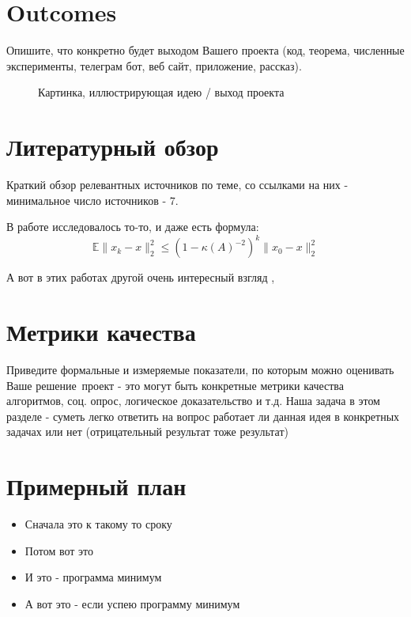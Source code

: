 \documentclass[]{scrartcl}
\begin{document}
\section{Outcomes}

Опишите, что конкретно будет выходом Вашего проекта (код, теорема, численные эксперименты, телеграм бот, веб сайт, приложение, рассказ).

\begin{figure}[h!]
	\caption{Картинка, иллюстрирующая идею / выход проекта}
\end{figure}


\section{Литературный обзор}
Краткий обзор релевантных источников по теме, со ссылками на них - минимальное число источников - 7.


В работе \cite{strohmer2009randomized} исследовалось то-то, и даже есть формула:
\begin{equation}
\mathbb{E} \|x_k - x\|_2^2 \leq \left(1 - \kappa (A) ^{-2}\right)^k \|x_0 - x\|_2^2
\end{equation}


А вот в этих работах другой очень интересный взгляд \cite{gower2015randomized}, \cite{dai2014randomized} 

\section{Метрики качества}
Приведите формальные и измеряемые показатели, по которым можно оценивать Ваше решение\ проект - это могут быть конкретные метрики качества алгоритмов, соц. опрос, логическое доказательство и т.д. Наша задача в этом разделе - суметь легко ответить на вопрос работает ли данная идея в конкретных задачах или нет (отрицательный результат тоже результат)

\section{Примерный план}
\begin{itemize}
	\item Сначала это к такому то сроку
	\item Потом вот это
	\item И это - программа минимум
	\item А вот это  - если успею программу минимум
\end{itemize}
\end{document}
